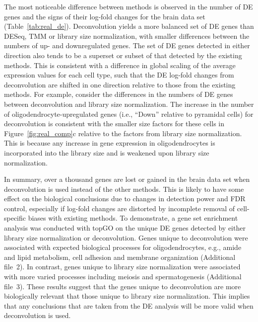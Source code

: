 \documentclass{bmcart}
\begin{document}
The most noticeable difference between methods is observed in the number of DE genes and the signs of their log-fold changes for the brain data set (Table~\ref{tab:real_de}).
Deconvolution yields a more balanced set of DE genes than DESeq, TMM or library size normalization, with smaller differences between the numbers of up- and downregulated genes.
The set of DE genes detected in either direction also tends to be a superset or subset of that detected by the existing methods.
This is consistent with a difference in global scaling of the average expression values for each cell type, 
    such that the DE log-fold changes from deconvolution are shifted in one direction relative to those from the existing methods.
For example, consider the differences in the numbers of DE genes between deconvolution and library size normalization.
The increase in the number of oligodendrocyte-upregulated genes (i.e., ``Down'' relative to pyramidal cells) for deconvolution is consistent with the smaller size factors for these cells in Figure~\ref{fig:real_comp}c relative to the factors from library size normalization.
This is because any increase in gene expression in oligodendrocytes is incorporated into the library size and is weakened upon library size normalization.

In summary, over a thousand genes are lost or gained in the brain data set when deconvolution is used instead of the other methods.
This is likely to have some effect on the biological conclusions due to changes in detection power and FDR control, 
    especially if log-fold changes are distorted by incomplete removal of cell-specific biases with existing methods.
To demonstrate, a gene set enrichment analysis was conducted with topGO \cite{alexa2010topgo} on the unique DE genes detected by either library size normalization or deconvolution.
Genes unique to deconvolution were associated with expected biological processes for oligodendrocytes, e.g., amide and lipid metabolism, cell adhesion and membrane organization (Additional file~2).
In contrast, genes unique to library size normalization were associated with more varied processes including meiosis and spermatogenesis (Additional file~3).
These results suggest that the genes unique to deconvolution are more biologically relevant that those unique to library size normalization.
This implies that any conclusions that are taken from the DE analysis will be more valid when deconvolution is used.
\end{document}
